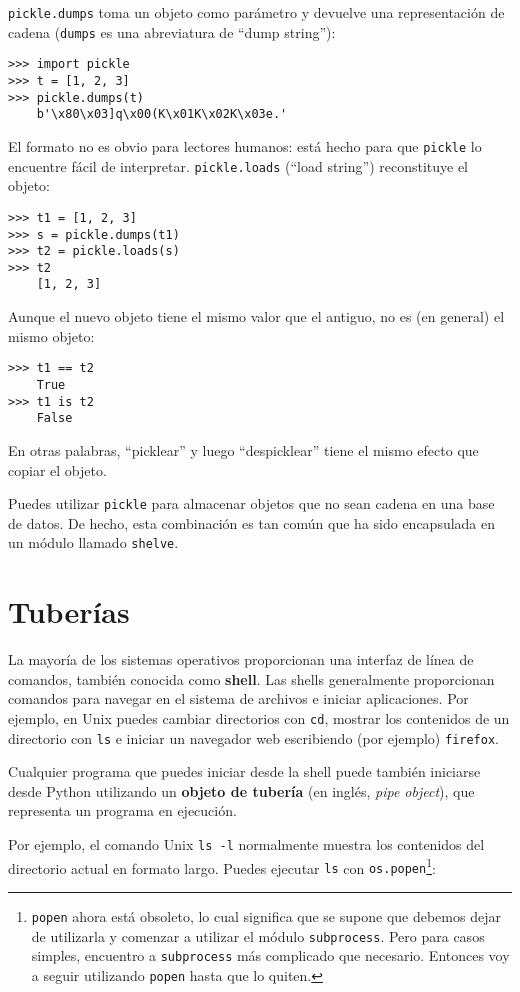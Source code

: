 \documentclass[10pt]{book}
\begin{document}
{\tt pickle.dumps} toma un objeto como parámetro y devuelve
una representación de cadena ({\tt dumps} es una abreviatura de ``dump string''):

\begin{verbatim}
>>> import pickle
>>> t = [1, 2, 3]
>>> pickle.dumps(t)
    b'\x80\x03]q\x00(K\x01K\x02K\x03e.'
\end{verbatim}
%
El formato no es obvio para lectores humanos: está hecho para que
{\tt pickle} lo encuentre fácil de interpretar.  {\tt pickle.loads}
(``load string'') reconstituye el objeto:

\begin{verbatim}
>>> t1 = [1, 2, 3]
>>> s = pickle.dumps(t1)
>>> t2 = pickle.loads(s)
>>> t2
    [1, 2, 3]
\end{verbatim}
%
Aunque el nuevo objeto tiene el mismo valor que el antiguo, no es
(en general) el mismo objeto:

\begin{verbatim}
>>> t1 == t2
    True
>>> t1 is t2
    False
\end{verbatim}
%
En otras palabras, ``picklear'' y luego ``despicklear'' tiene el mismo efecto
que copiar el objeto.

Puedes utilizar {\tt pickle} para almacenar objetos que no sean cadena en una base de datos.
De hecho, esta combinación es tan común que ha sido
encapsulada en un módulo llamado {\tt shelve}.


\section{Tuberías}

La mayoría de los sistemas operativos proporcionan una interfaz de línea de comandos,
también conocida como {\bf shell}.  Las shells generalmente proporcionan comandos
para navegar en el sistema de archivos e iniciar aplicaciones.  Por
ejemplo, en Unix puedes cambiar directorios con {\tt cd},
mostrar los contenidos de un directorio con {\tt ls} e iniciar
un navegador web escribiendo (por ejemplo) {\tt firefox}.

Cualquier programa que puedes iniciar desde la shell puede también
iniciarse desde Python utilizando un {\bf objeto de tubería} (en inglés, {\em pipe object}), que
representa un programa en ejecución.

Por ejemplo, el comando Unix {\tt ls -l} normalmente muestra los
contenidos del directorio actual en formato largo.  Puedes
ejecutar {\tt ls} con {\tt os.popen}\footnote{{\tt popen} ahora está
obsoleto, lo cual significa que se supone que debemos dejar de utilizarla y comenzar a utilizar
el módulo {\tt subprocess}.  Pero para casos simples, encuentro a
{\tt subprocess} más complicado que necesario.  Entonces voy a
seguir utilizando {\tt popen} hasta que lo quiten.}:
\end{document}
